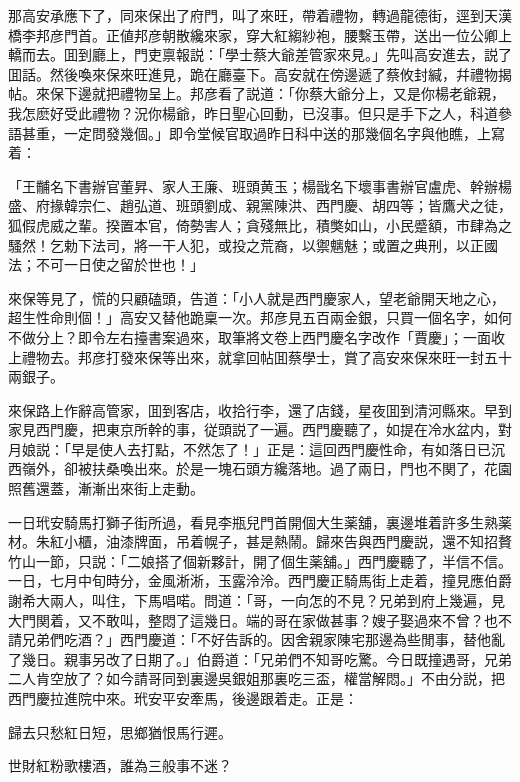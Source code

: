 那高安承應下了，同來保出了府門，叫了來旺，帶着禮物，轉過龍德街，逕到天漢橋李邦彦門首。正値邦彦朝散纔來家，穿大紅縐紗袍，腰繫玉帶，送出一位公卿上轎而去。囬到廳上，門吏禀報説：「學士蔡大爺差管家來見。」先叫高安進去，説了囬話。然後喚來保來旺進見，跪在廳臺下。高安就在傍邊遞了蔡攸封緘，幷禮物揭帖。來保下邊就把禮物呈上。邦彦看了説道：「你蔡大爺分上，又是你楊老爺親，我怎麽好受此禮物？況你楊爺，昨日聖心回動，已沒事。但只是手下之人，科道參語甚重，一定問發幾個。」即令堂候官取過昨日科中送的那幾個名字與他瞧，上寫着：

\begin{myquote}[\markfont]
「王黼名下書辦官董昇、家人王廉、班頭黄玉；楊戩名下壞事書辦官盧虎、幹辦楊盛、府掾韓宗仁、趙弘道、班頭劉成、親黨陳洪、西門慶、胡四等；皆鷹犬之徒，狐假虎威之輩。揆置本官，倚勢害人；貪殘無比，積獘如山，小民蹙額，巿肆為之騷然！乞勅下法司，將一干人犯，或投之荒裔，以禦魑魅；或置之典刑，以正國法；不可一日使之留於世也！」
\end{myquote}

來保等見了，慌的只顧磕頭，告道：「小人就是西門慶家人，望老爺開天地之心，超生性命則個！」高安又替他跪稟一次。邦彦見五百兩金銀，只買一個名字，如何不做分上？即令左右擡書案過來，取筆將文卷上西門慶名字改作「賈慶」；一面收上禮物去。邦彦打發來保等出來，就拿回帖囬蔡學士，賞了高安來保來旺一封五十兩銀子。

來保路上作辭高管家，囬到客店，收拾行李，還了店錢，星夜囬到清河縣來。早到家見西門慶，把東京所幹的事，従頭説了一遍。西門慶聽了，如提在冷水盆内，對月娘説：「早是使人去打點，不然怎了！」正是：這回西門慶性命，有如落日已沉西嶺外，卻被扶桑喚出來。於是一塊石頭方纔落地。過了兩日，門也不関了，花園照舊還蓋，漸漸出來街上走動。

一日玳安騎馬打獅子街所過，看見李瓶兒門首開個大生薬舖，裏邊堆着許多生熟薬材。朱紅小櫃，油漆牌面，吊着幌子，甚是熱鬧。歸來告與西門慶説，還不知招贅竹山一節，只説：「二娘搭了個新夥計，開了個生薬舖。」西門慶聽了，半信不信。一日，七月中旬時分，金風淅淅，玉露泠泠。西門慶正騎馬街上走着，撞見應伯爵謝希大兩人，叫住，下馬唱喏。問道：「哥，一向怎的不見？兄弟到府上幾遍，見大門関着，又不敢叫，整悶了這幾日。端的哥在家做甚事？嫂子娶過來不曾？也不請兄弟們吃酒？」西門慶道：「不好告訴的。因舍親家陳宅那邊為些閒事，替他亂了幾日。親事另改了日期了。」伯爵道：「兄弟們不知哥吃驚。今日既撞遇哥，兄弟二人肯空放了？如今請哥同到裏邊吳銀姐那裏吃三盃，權當解悶。」不由分説，把西門慶拉進院中來。玳安平安牽馬，後邊跟着走。正是：

\begin{myquote}
歸去只愁紅日短，思鄉猶恨馬行遲。

世財紅粉歌樓酒，誰為三般事不迷？
\end{myquote}

